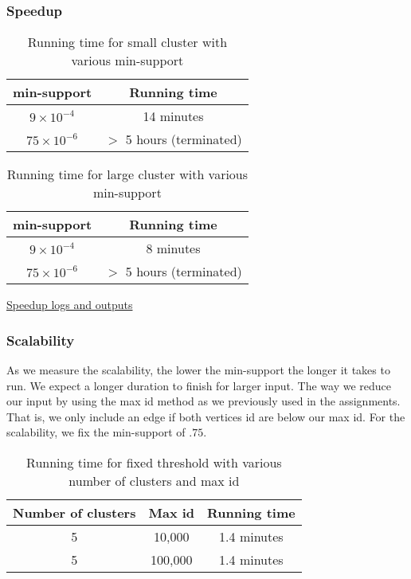 \documentclass[11pt]{article}
\begin{document}
\subsubsection{Speedup}


\begin{table}[h!]
    \centering
    \begin{tabular}{||c c||}
        \hline
        min-support & Running time \\
        \hline\hline
        $9 \times 10^{-4}$ & 14 minutes \\
        $75 \times 10^{-6}$ & $>$ 5 hours (terminated) \\
        \hline
    \end{tabular}
    \caption{Running time for small cluster with various min-support}
    \label{table:2}
\end{table}

\begin{table}[h!]
    \centering
    \begin{tabular}{||c c||}
        \hline
        min-support & Running time \\
        \hline\hline
        $9 \times 10^{-4}$ & 8 minutes \\
        $75 \times 10^{-6}$ & $>$ 5 hours (terminated) \\
        \hline
    \end{tabular}
    \caption{Running time for large cluster with various min-support}
    \label{table:3}
\end{table}

\href{https://github.ccs.neu.edu/prdx/CS6240-Project/tree/master/awsSpeedUpRuns}{Speedup logs and outputs}

\subsubsection{Scalability}

As we measure the scalability, the lower the min-support the longer it takes to run.
We expect a longer duration to finish for larger input.
The way we reduce our input by using the max id method as we previously used in the assignments.
That is, we only include an edge if both vertices id are below our max id.
For the scalability, we fix the min-support of $.75$.

\begin{table}[h!]
    \centering
    \begin{tabular}{||c c c||}
        \hline
        Number of clusters & Max id & Running time \\
        \hline\hline
        5 & 10,000 & 1.4 minutes \\
        5 & 100,000 & 1.4 minutes \\
        \hline
    \end{tabular}
    \caption{Running time for fixed threshold with various number of clusters and max id}
    \label{table:4}
\end{table}
\end{document}
